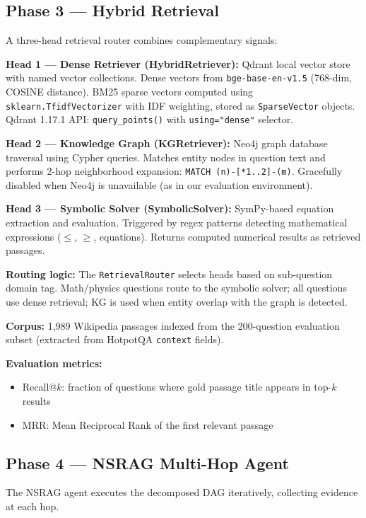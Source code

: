 \documentclass[conference]{IEEEtran}
\begin{document}
\subsection{Phase 3 — Hybrid Retrieval}
\label{sec:phase3}

A three-head retrieval router combines complementary signals:

\textbf{Head 1 — Dense Retriever (HybridRetriever):} Qdrant local vector store with named vector collections. Dense vectors from \texttt{bge-base-en-v1.5} (768-dim, COSINE distance). BM25 sparse vectors computed using \texttt{sklearn.TfidfVectorizer} with IDF weighting, stored as \texttt{SparseVector} objects. Qdrant 1.17.1 API: \texttt{query\_points()} with \texttt{using="dense"} selector.

\textbf{Head 2 — Knowledge Graph (KGRetriever):} Neo4j graph database traversal using Cypher queries. Matches entity nodes in question text and performs 2-hop neighborhood expansion: \texttt{MATCH (n)-[*1..2]-(m)}. Gracefully disabled when Neo4j is unavailable (as in our evaluation environment).

\textbf{Head 3 — Symbolic Solver (SymbolicSolver):} SymPy-based equation extraction and evaluation. Triggered by regex patterns detecting mathematical expressions ($\leq$, $\geq$, equations). Returns computed numerical results as retrieved passages.

\textbf{Routing logic:} The \texttt{RetrievalRouter} selects heads based on sub-question domain tag. Math/physics questions route to the symbolic solver; all questions use dense retrieval; KG is used when entity overlap with the graph is detected.

\textbf{Corpus:} 1,989 Wikipedia passages indexed from the 200-question evaluation subset (extracted from HotpotQA \texttt{context} fields).

\textbf{Evaluation metrics:}
\begin{itemize}
    \item Recall@$k$: fraction of questions where gold passage title appears in top-$k$ results
    \item MRR: Mean Reciprocal Rank of the first relevant passage
\end{itemize}

\subsection{Phase 4 — NSRAG Multi-Hop Agent}
\label{sec:phase4}

The NSRAG agent executes the decomposed DAG iteratively, collecting evidence at each hop.
\end{document}
